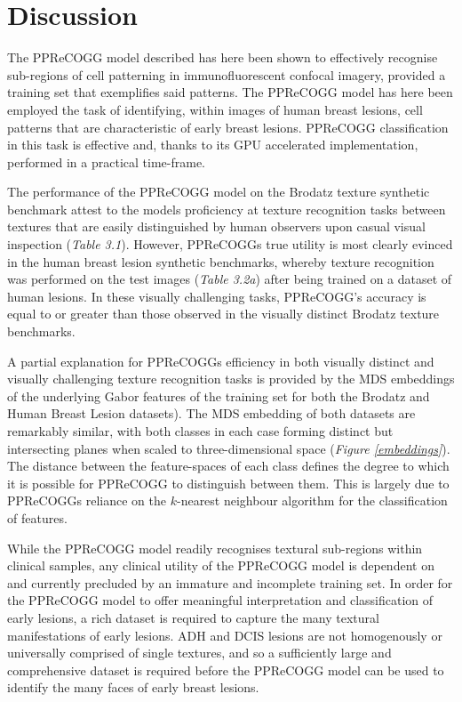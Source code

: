 \section{Discussion}

The PPReCOGG model described has here been shown to effectively recognise sub-regions of cell patterning in immunofluorescent confocal imagery, provided a training set that exemplifies said patterns. The PPReCOGG model has here been employed the task of identifying, within images of human breast lesions, cell patterns that are characteristic of early breast lesions. PPReCOGG classification in this task is effective and, thanks to its GPU accelerated implementation, performed in a practical time-frame.\par

The performance of the PPReCOGG model on the Brodatz texture synthetic benchmark attest to the models proficiency at texture recognition tasks between textures that are easily distinguished by human observers upon casual visual inspection (\textit{Table 3.1}). However, PPReCOGGs true utility is most clearly evinced in the human breast lesion synthetic benchmarks, whereby texture recognition was performed on the test images (\textit{Table 3.2a}) after being trained on a dataset of human lesions. In these visually challenging tasks, PPReCOGG's accuracy is equal to or greater than those observed in the visually distinct Brodatz texture benchmarks.\par

A partial explanation for PPReCOGGs efficiency in both visually distinct and visually challenging texture recognition tasks is provided by the MDS embeddings of the underlying Gabor features of the training set for both the Brodatz and Human Breast Lesion datasets). The MDS embedding of both datasets are remarkably similar, with both classes in each case forming distinct but intersecting planes when scaled to three-dimensional space (\textit{Figure \ref{embeddings}}). The distance between the feature-spaces of each class defines the degree to which it is possible for PPReCOGG to distinguish between them. This is largely due to PPReCOGGs reliance on the $k$-nearest neighbour algorithm for the classification of features.\par

While the PPReCOGG model readily recognises textural sub-regions within clinical samples, any clinical utility of the PPReCOGG model is dependent on and currently precluded by an immature and incomplete training set. In order for the PPReCOGG model to offer meaningful interpretation and classification of early lesions, a rich dataset is required to capture the many textural manifestations of early lesions. ADH and DCIS lesions are not homogenously or universally comprised of single textures, and so a sufficiently large and comprehensive dataset is required before the PPReCOGG model can be used to identify the many faces of early breast lesions. \par


